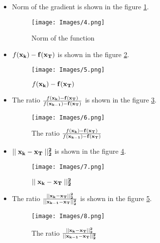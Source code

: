 \documentclass{article}
\begin{document}
\begin{itemize}
    \item Norm of the gradient is shown in the figure \ref{fig:gradient_norm}.

    \begin{figure}
        \centering
        \texttt{[image: Images/4.png]}
        \caption{Norm of the function}
        \label{fig:gradient_norm}
    \end{figure}

    \item $f(\bf{x_k}) - f(\bf{x_T})$ is shown in the figure \ref{fig:f_difference}.
    
    \begin{figure}
        \centering
        \texttt{[image: Images/5.png]}
        \caption{$f(\bf{x_k}) - f(\bf{x_T})$}
        \label{fig:f_difference}
    \end{figure}

    \item The ratio $\frac{f(\bf{x_k}) - f(\bf{x_T})}{f(\bf{x_{k - 1}}) - f(\bf{x_T})}$ is shown in the figure \ref{fig:f_ratio}.
    
    \begin{figure}
        \centering
        \texttt{[image: Images/6.png]}
        \caption{The ratio $\frac{f(\bf{x_k}) - f(\bf{x_T})}{f(\bf{x_{k - 1}}) - f(\bf{x_T})}$}
        \label{fig:f_ratio}
    \end{figure}

    \item $\mid \mid \bf{x_k} - \bf{x_T} \mid \mid_2^2$ is shown in the figure \ref{fig:x_difference}.
    
    \begin{figure}
        \centering
        \texttt{[image: Images/7.png]}
        \caption{$\mid \mid \bf{x_k} - \bf{x_T} \mid \mid_2^2$}
        \label{fig:x_difference}
    \end{figure}

    \item The ratio $\frac{\mid \mid \bf{x_k} - \bf{x_T} \mid \mid_2^2}{\mid \mid \bf{x_{k - 1}} - \bf{x_T} \mid \mid_2^2}$ is shown in the figure \ref{fig:x_ratio}.
    
    \begin{figure}[H]
        \centering
        \texttt{[image: Images/8.png]}
        \caption{The ratio $\frac{\mid \mid \bf{x_k} - \bf{x_T} \mid \mid_2^2}{\mid \mid \bf{x_{k - 1}} - \bf{x_T} \mid \mid_2^2}$}
        \label{fig:x_ratio}
    \end{figure}
\end{itemize}
\end{document}
